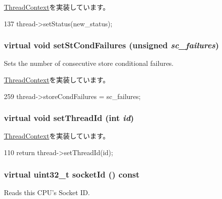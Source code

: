 \hyperlink{classThreadContext_ab09e388dd57fd5b8e05da30473b0a859}{ThreadContext}を実装しています。


\begin{DoxyCode}
137     { thread->setStatus(new_status); }
\end{DoxyCode}
\hypertarget{classO3ThreadContext_af236f8e23dce0c08a46c19ebfdb1aaaf}{
\subsubsection[{setStCondFailures}]{\setlength{\rightskip}{0pt plus 5cm}virtual void setStCondFailures (unsigned {\em sc\_\-failures})}}
\label{classO3ThreadContext_af236f8e23dce0c08a46c19ebfdb1aaaf}
Sets the number of consecutive store conditional failures. 

\hyperlink{classThreadContext_aaa3506321089a0ec9c36d9ceff17c346}{ThreadContext}を実装しています。


\begin{DoxyCode}
259     { thread->storeCondFailures = sc_failures; }
\end{DoxyCode}
\hypertarget{classO3ThreadContext_ad657dfeae3efbb82eeb0b82b1337217a}{
\subsubsection[{setThreadId}]{\setlength{\rightskip}{0pt plus 5cm}virtual void setThreadId (int {\em id})}}
\label{classO3ThreadContext_ad657dfeae3efbb82eeb0b82b1337217a}


\hyperlink{classThreadContext_a8ab94437bf0aaa86face2bc4b2dfa138}{ThreadContext}を実装しています。


\begin{DoxyCode}
110 { return thread->setThreadId(id); }
\end{DoxyCode}
\hypertarget{classO3ThreadContext_ac778b8592630d93d3cecb6a663a6f038}{
\subsubsection[{socketId}]{\setlength{\rightskip}{0pt plus 5cm}virtual {\bf uint32\_\-t} socketId () const}}
\label{classO3ThreadContext_ac778b8592630d93d3cecb6a663a6f038}
Reads this CPU's Socket ID. 

